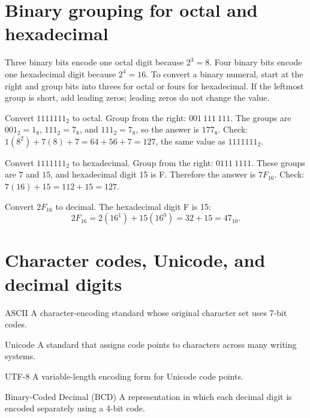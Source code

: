 \section{Binary grouping for octal and hexadecimal}
Three binary bits encode one octal digit because $2^3=8$. Four binary bits
encode one hexadecimal digit because $2^4=16$. To convert a binary numeral,
start at the right and group bits into threes for octal or fours for
hexadecimal. If the leftmost group is short, add leading zeros; leading
zeros do not change the value.

\begin{example}
Convert $1111111_2$ to octal. Group from the right:
$001\ 111\ 111$. The groups are $001_2=1_8$, $111_2=7_8$, and
$111_2=7_8$, so the answer is $177_8$. Check:
$1(8^2)+7(8)+7=64+56+7=127$, the same value as $1111111_2$.
\end{example}

\begin{example}
Convert $1111111_2$ to hexadecimal. Group from the right:
$0111\ 1111$. These groups are $7$ and $15$, and hexadecimal digit 15 is
F. Therefore the answer is $7F_{16}$. Check:
$7(16)+15=112+15=127$.
\end{example}

\begin{example}
Convert $2F_{16}$ to decimal. The hexadecimal digit F is 15:
\[
2F_{16}=2(16^1)+15(16^0)=32+15=47_{10}.
\]
\end{example}

\section{Character codes, Unicode, and decimal digits}
\begin{definitionbox}{ASCII}
A character-encoding standard whose original character set uses 7-bit
codes.
\end{definitionbox}

\begin{definitionbox}{Unicode}
A standard that assigns code points to characters across many writing
systems.
\end{definitionbox}

\begin{definitionbox}{UTF-8}
A variable-length encoding form for Unicode code points.
\end{definitionbox}

\begin{definitionbox}{Binary-Coded Decimal (BCD)}
A representation in which each decimal digit is encoded separately using a
4-bit code.
\end{definitionbox}

